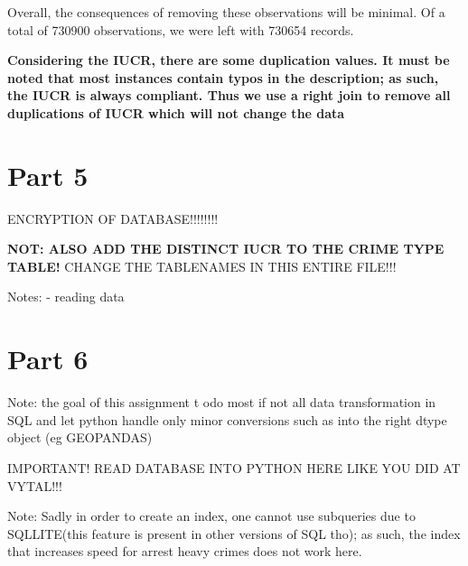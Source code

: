 \documentclass[a4paper]{article}
\begin{document}
Overall, the consequences of removing these observations will be minimal. Of a total of 730900 observations, we were left with 730654 records. 


\textbf{Considering the IUCR, there are some duplication values. It must be noted that most instances contain typos in the description; as such, the IUCR is always compliant. Thus we use a right join to remove all duplications of IUCR which will not change the data}

\section{Part 5}
ENCRYPTION OF DATABASE!!!!!!!!

\textbf{NOT: ALSO ADD THE DISTINCT IUCR TO THE CRIME TYPE TABLE!}
CHANGE THE TABLENAMES IN THIS ENTIRE FILE!!! 


Notes:
- reading data
%
%
%



\section{Part 6}

Note: the goal of this assignment t odo most if not all data transformation in SQL and let python handle only minor conversions such as into the right dtype object (eg GEOPANDAS)

IMPORTANT! READ DATABASE INTO PYTHON HERE LIKE YOU DID AT VYTAL!!!

Note: Sadly in order to create an index, one cannot use subqueries due to SQLLITE(this feature is present in other versions of SQL tho); as such, the index that increases speed for arrest heavy crimes does not work here. 
\end{document}
